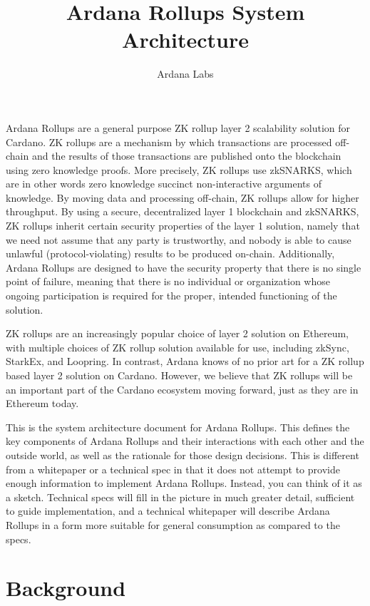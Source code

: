 \documentclass[12pt]{article}
\title{Ardana Rollups System Architecture}
\author{Ardana Labs}
\begin{document}
\maketitle


Ardana Rollups are a general purpose ZK rollup layer 2 scalability solution for Cardano. ZK rollups are a mechanism by which transactions are processed off-chain and the results of those transactions are published onto the blockchain using zero knowledge proofs. More precisely, ZK rollups use zkSNARKS, which are in other words zero knowledge succinct non-interactive arguments of knowledge. By moving data and processing off-chain, ZK rollups allow for higher throughput. By using a secure, decentralized layer 1 blockchain and zkSNARKS, ZK rollups inherit certain security properties of the layer 1 solution, namely that we need not assume that any party is trustworthy, and nobody is able to cause unlawful (protocol-violating) results to be produced on-chain. Additionally, Ardana Rollups are designed to have the security property that there is no single point of failure, meaning that there is no individual or organization whose ongoing participation is required for the proper, intended functioning of the solution.

ZK rollups are an increasingly popular choice of layer 2 solution on Ethereum, with multiple choices of ZK rollup solution available for use, including zkSync, StarkEx, and Loopring. \cite{ethworks-20} In contrast, Ardana knows of no prior art for a ZK rollup based layer 2 solution on Cardano. However, we believe that ZK rollups will be an important part of the Cardano ecosystem moving forward, just as they are in Ethereum today.

This is the system architecture document for Ardana Rollups. This defines the key components of Ardana Rollups and their interactions with each other and the outside world, as well as the rationale for those design decisions. This is different from a whitepaper or a technical spec in that it does not attempt to provide enough information to implement Ardana Rollups. Instead, you can think of it as a sketch. Technical specs will fill in the picture in much greater detail, sufficient to guide implementation, and a technical whitepaper will describe Ardana Rollups in a form more suitable for general consumption as compared to the specs.

\section{Background}
\end{document}
